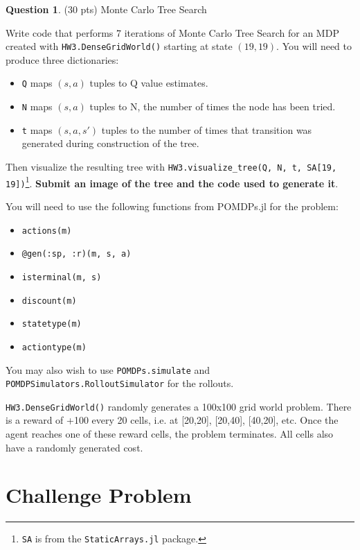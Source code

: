 \documentclass{article}
\theoremstyle{definition}
\newtheorem{question}[thm]{Question}
\begin{document}
\begin{question}\label{q:mcts}
    (30 pts) Monte Carlo Tree Search
    
    Write code that performs 7 iterations of Monte Carlo Tree Search for an MDP created with \texttt{HW3.DenseGridWorld()} starting at state $(19, 19)$. You will need to produce three dictionaries:
    \begin{itemize}[noitemsep]
        \item \texttt{Q} maps $(s, a)$ tuples to Q value estimates.
        \item \texttt{N} maps $(s, a)$ tuples to N, the number of times the node has been tried.
        \item \texttt{t} maps $(s, a, s')$ tuples to the number of times that transition was generated during construction of the tree.
    \end{itemize}
    Then visualize the resulting tree with \texttt{HW3.visualize\_tree(Q, N, t, SA[19, 19])}\footnote{\texttt{SA} is from the \texttt{StaticArrays.jl} package.}. \textbf{Submit an image of the tree and the code used to generate it}.
    
    You will need to use the following functions from POMDPs.jl for the problem:
    \begin{itemize}[noitemsep]
        \item \texttt{actions(m)}
        \item \texttt{@gen(:sp, :r)(m, s, a)}
        \item \texttt{isterminal(m, s)}
        \item \texttt{discount(m)}
        \item \texttt{statetype(m)}
        \item \texttt{actiontype(m)}
    \end{itemize}

    You may also wish to use \texttt{POMDPs.simulate} and \texttt{POMDPSimulators.RolloutSimulator} for the rollouts.

    \texttt{HW3.DenseGridWorld()} randomly generates a 100x100 grid world problem. There is a reward of +100 every 20 cells, i.e. at [20,20], [20,40], [40,20], etc. Once the agent reaches one of these reward cells, the problem terminates. All cells also have a randomly generated cost.
\end{question}

\section{Challenge Problem}
\end{document}
